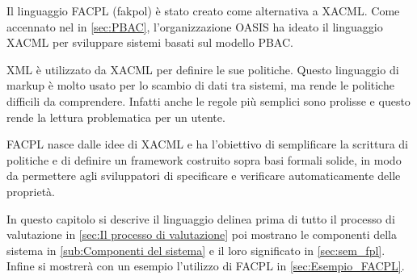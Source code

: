 \label{chap:Formal Access Control Policy Language}
Il linguaggio \ac{FACPL} (fakpol) è stato creato come alternativa a \ac{XACML}. Come accennato nel in \ref{sec:PBAC},
l'organizzazione \ac{OASIS} ha ideato il linguaggio XACML per sviluppare sistemi basati sul modello \ac{PBAC}.\par
\ac{XML} è utilizzato da \ac{XACML} per definire le sue politiche. Questo linguaggio di markup è molto usato per lo scambio
di dati tra sistemi, ma rende le politiche difficili da comprendere. Infatti anche le regole più semplici sono prolisse
e questo rende la lettura problematica per un utente.\par
\ac{FACPL} nasce dalle idee di \ac{XACML} e ha l'obiettivo di semplificare la scrittura di politiche e di definire un framework
costruito sopra basi formali solide, in modo da permettere agli sviluppatori di specificare e verificare automaticamente
delle proprietà.

In questo capitolo si descrive il linguaggio delinea prima di tutto il processo di valutazione in \ref{sec:Il processo di valutazione}
poi mostrano le componenti della sistema in \ref{sub:Componenti del sistema} e il loro significato in \ref{sec:sem_fpl}. Infine si
mostrerà con un esempio l'utilizzo di \ac{FACPL} in \ref{sec:Esempio_FACPL}.
